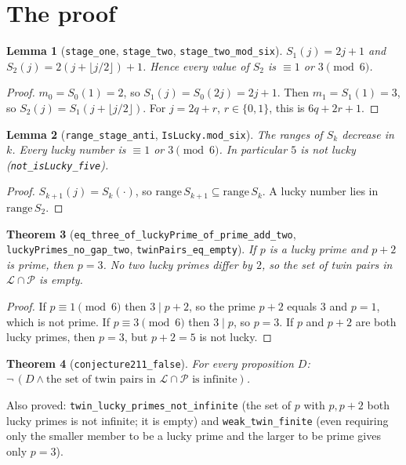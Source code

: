 \documentclass[11pt]{article}
\newtheorem{theorem}{Theorem}
\newtheorem{lemma}[theorem]{Lemma}
\theoremstyle{definition}
\begin{document}
\section{The proof}

\begin{lemma}[\texttt{stage\_one}, \texttt{stage\_two}, \texttt{stage\_two\_mod\_six}]
$S_1(j)=2j+1$ and $S_2(j)=2(j+\lfloor j/2\rfloor)+1$. Hence every value of $S_2$ is $\equiv 1$ or
$3 \pmod 6$.
\end{lemma}
\begin{proof}
$m_0=S_0(1)=2$, so $S_1(j)=S_0(2j)=2j+1$. Then $m_1=S_1(1)=3$, so
$S_2(j)=S_1(j+\lfloor j/2\rfloor)$. For $j=2q+r$, $r\in\{0,1\}$, this is $6q+2r+1$.
\end{proof}

\begin{lemma}[\texttt{range\_stage\_anti}, \texttt{IsLucky.mod\_six}]
The ranges of $S_k$ decrease in $k$. Every lucky number is $\equiv 1$ or $3\pmod 6$. In particular
$5$ is not lucky (\texttt{not\_isLucky\_five}).
\end{lemma}
\begin{proof}
$S_{k+1}(j)=S_k(\cdot)$, so $\mathrm{range}\,S_{k+1}\subseteq\mathrm{range}\,S_k$. A lucky number
lies in $\mathrm{range}\,S_2$.
\end{proof}

\begin{theorem}[\texttt{eq\_three\_of\_luckyPrime\_of\_prime\_add\_two},
\texttt{luckyPrimes\_no\_gap\_two}, \texttt{twinPairs\_eq\_empty}]
If $p$ is a lucky prime and $p+2$ is prime, then $p=3$. No two lucky primes differ by $2$, so
the set of twin pairs in $\mathcal{L}\cap\mathcal{P}$ is empty.
\end{theorem}
\begin{proof}
If $p\equiv 1\pmod 6$ then $3\mid p+2$, so the prime $p+2$ equals $3$ and $p=1$, which is not
prime. If $p\equiv 3\pmod 6$ then $3\mid p$, so $p=3$. If $p$ and $p+2$ are both lucky primes,
then $p=3$, but $p+2=5$ is not lucky.
\end{proof}

\begin{theorem}[\texttt{conjecture211\_false}]
For every proposition $D$: $\neg\,(D \wedge \text{the set of twin pairs in } \mathcal{L}\cap
\mathcal{P}\text{ is infinite})$.
\end{theorem}

Also proved: \texttt{twin\_lucky\_primes\_not\_infinite} (the set of $p$ with $p,p+2$ both lucky
primes is not infinite; it is empty) and \texttt{weak\_twin\_finite} (even requiring only the smaller
member to be a lucky prime and the larger to be prime gives only $p=3$).
\end{document}
